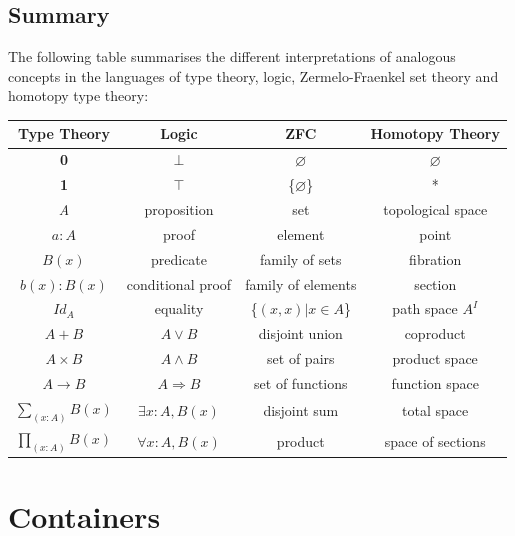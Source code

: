 \documentclass[12pt]{report}
\begin{document}
\section{Summary}

The following table summarises the different interpretations of analogous concepts in the languages of type theory, logic, Zermelo-Fraenkel set theory and homotopy type theory:

\begin{center}
\begin{tabular}{| c | c | c | c |}
\hline
\textbf{Type Theory} & \textbf{Logic} & \textbf{ZFC} & \textbf{Homotopy Theory}\\
\hline
\textbf{0} & $\bot$ & $\varnothing$ &$\varnothing$\\
\textbf{1} & $\top$ & \{$\varnothing$\} &*\\
\textit{A} & proposition & set & topological space\\
$a : A$ & proof & element & point\\
$B(x)$ & predicate & family of sets & fibration\\
$b(x) : B(x)$ & conditional proof & family of elements & section\\
$ Id_A $ & equality & \{$ (x,x) | x \in A $\} & path space $A^{\textit{I}}$\\
$A + B$ & $A \vee B$ & disjoint union & coproduct\\
$ A \times B$ & $A \wedge B$ & set of pairs & product space\\
$A \rightarrow B$ & $A \Rightarrow B$ & set of functions & function space\\
$ \sum_{(x:A)}^{} B(x) $ & $\exists x:A, B(x) $ & disjoint sum & total space\\
$ \prod_{(x:A)}^{} B(x) $ & $\forall x:A, B(x) $ & product & space of sections\\
\hline
\end{tabular}
\end{center}


\chapter{Containers}
\end{document}
